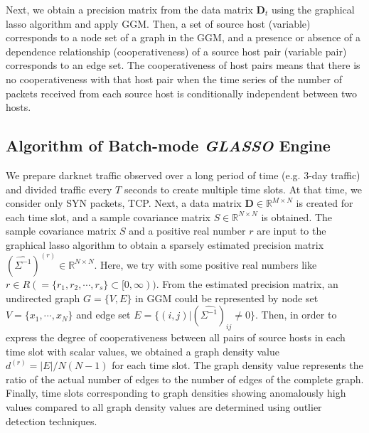 \documentclass[conference]{IEEEtran}
\begin{document}
Next, we obtain a precision matrix from the data matrix $\bm{D}_t$ using the graphical lasso algorithm and apply GGM.
Then, a set of source host (variable) corresponds to a node set of a graph in the GGM, and a presence or absence of a dependence relationship (cooperativeness) of a source host pair (variable pair) corresponds to an edge set.
The cooperativeness of host pairs means that there is no cooperativeness with that host pair when the time series of the number of packets received from each source host is conditionally independent between two hosts.




\subsection{Algorithm of Batch-mode {\it GLASSO} Engine}
We prepare darknet traffic observed over a long period of time (e.g. 3-day traffic) and divided traffic every $T$ seconds to create multiple time slots.
At that time, we consider only SYN packets, TCP.
Next, a data matrix $\bm{D}\in\mathbb{R}^{M \times N}$ is created for each time slot, and a sample covariance matrix $S\in\mathbb{R}^{N \times N}$ is obtained.
The sample covariance matrix $S$ and a positive real number $r$ are input to the graphical lasso algorithm to obtain a sparsely estimated precision matrix ${(\hat{\Sigma^{-1}})}^{(r)}\in\mathbb{R}^{N \times N}$.
Here, we try with some positive real numbers like $r \in R ( = \{r_1, r_2, \cdots, r_s\} \subset [0,\infty))$.
From the estimated precision matrix, an undirected graph $G = \{V, E\}$ in GGM could be represented by node set $V=\{x_{1}, \cdots, x_{N}\}$ and edge set $E=\{(i,j)|{(\hat{\Sigma^{-1}})}_{ij}\neq0\}$.
Then, in order to express the degree of cooperativeness between all pairs of source hosts in each time slot with scalar values, we obtained a graph density value $d^{(r)}=|E|/N(N-1)$ for each time slot.
The graph density value represents the ratio of the actual number of edges to the number of edges of the complete graph.
Finally, time slots corresponding to graph densities showing anomalously high values compared to all graph density values are determined using outlier detection techniques.
\end{document}
